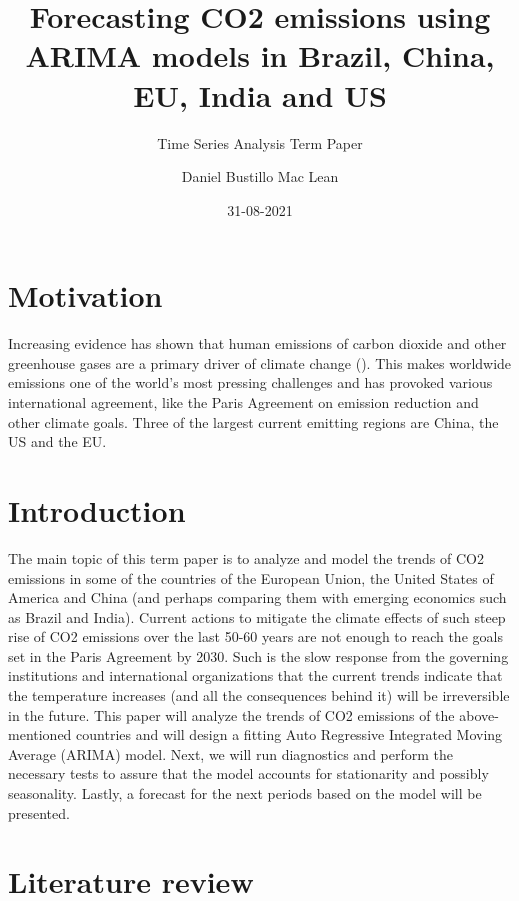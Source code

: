 \documentclass[
]{article}
\title{Forecasting CO2 emissions using ARIMA models in Brazil, China,
EU, India and US}
\subtitle{Time Series Analysis Term Paper}
\author{Daniel Bustillo Mac Lean}
\date{31-08-2021}
\begin{document}
\maketitle

{
\setcounter{tocdepth}{2}
\tableofcontents
}
\hypertarget{motivation}{%
\section{Motivation}\label{motivation}}

Increasing evidence has shown that human emissions of carbon dioxide and
other greenhouse gases are a primary driver of climate change
(\citet{stocker2014climate}). This makes worldwide emissions one of the
world's most pressing challenges and has provoked various international
agreement, like the Paris Agreement on emission reduction and other
climate goals. Three of the largest current emitting regions are China,
the US and the EU.

\newpage

\hypertarget{introduction}{%
\section{Introduction}\label{introduction}}

The main topic of this term paper is to analyze and model the trends of
CO2 emissions in some of the countries of the European Union, the United
States of America and China (and perhaps comparing them with emerging
economics such as Brazil and India). Current actions to mitigate the
climate effects of such steep rise of CO2 emissions over the last 50-60
years are not enough to reach the goals set in the Paris Agreement by
2030. Such is the slow response from the governing institutions and
international organizations that the current trends indicate that the
temperature increases (and all the consequences behind it) will be
irreversible in the future. This paper will analyze the trends of CO2
emissions of the above-mentioned countries and will design a fitting
Auto Regressive Integrated Moving Average (ARIMA) model. Next, we will
run diagnostics and perform the necessary tests to assure that the model
accounts for stationarity and possibly seasonality. Lastly, a forecast
for the next periods based on the model will be presented.

\hypertarget{literature-review}{%
\section{Literature review}\label{literature-review}}
\end{document}
